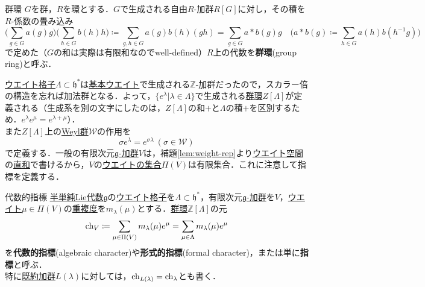 \documentclass[rep_main]{subfiles}
\begin{document}
\begin{mydef}[label=def:group-ring]{群環}
	$G$を群，$R$を環とする．$G$で生成される自由$R$-加群$R[G]$に対し，その積を$R$-係数の畳み込み
	\begin{equation}
		\biggl(\sum_{g \in G} a(g)g \biggr)\biggl(\sum_{h \in G} b(h)h \biggr) \coloneqq \sum_{g, h \in G} a(g)b(h)(gh) = \sum_{g \in G} a *b(g)g\quad  \biggl(a * b(g) \coloneqq \sum_{h \in G} a(h)b(h^{-1}g)\biggr)
	\end{equation}
	で定めた（$G$の和は実際は有限和なのでwell-defined）$R$上の代数を\textbf{群環}(group ring)と呼ぶ．
\end{mydef}
\hyperref[def:root-lattice]{ウエイト格子}$\Lambda \subset \mathfrak{h}^*$は\hyperref[def:fundamental-weight]{基本ウエイト}で生成される$\mathbb{Z}$-加群だったので，スカラー倍の構造を忘れば加法群となる．よって，$\{e^\lambda | \lambda \in \Lambda\}$で生成される\hyperref[def:group-ring]{群環}$Z[\Lambda]$が定義される（生成系を別の文字にしたのは，$Z[\Lambda]$の和$+$と$\Lambda$の積$+$を区別するため．$e^\lambda e^\mu = e^{\lambda + \mu}$）．\\
また$Z[\Lambda]$上の\hyperref[def:Weylgroup]{Weyl群}$\mathscr{W}$の作用を
\begin{equation}
	\sigma e^\lambda = e^{\sigma\lambda}\ (\sigma \in \mathscr{W})
\end{equation}
で定義する．一般の有限次元\hyperref[ax:g-module]{$\mathfrak{g}$-加群}$V$は，補題\ref{lem:weight-rep}より\hyperref[def:weight-rep]{ウエイト空間}の\hyperref[def:univ-vec-sum]{直和}で書けるから，$V$の\hyperref[def:weight-rep]{ウエイトの集合}$\Pi(V)$は有限集合．これに注意して指標を定義する．
\begin{mydef}[label=def:alg-character]{代数的指標}
	\hyperref[def:semisimple-LieAlg]{半単純Lie代数}$\mathfrak{g}$の\hyperref[def:root-lattice]{ウエイト格子}を$\Lambda \subset \mathfrak{h}^*$，有限次元\hyperref[ax:g-module]{$\mathfrak{g}$-加群}を$V$，\hyperref[def:weight-rep]{ウエイト}$\mu \in \Pi(V)$の\hyperref[def:mutiplicity]{重複度}を$m_\lambda(\mu)$とする．\hyperref[def:group-ring]{群環}$\mathbb{Z}[\Lambda]$の元
	\begin{equation}
		\operatorname{ch}_V \coloneqq \sum_{\mu \in \Pi(V)} m_\lambda(\mu)e^\mu = \sum_{\mu \in \Lambda} m_\lambda(\mu)e^\mu
	\end{equation}
	を\textbf{代数的指標}(algebraic character)や\textbf{形式的指標}(formal character)，または単に\textbf{指標}と呼ぶ．\\
	特に\hyperref[thm:hwmodule-exist]{既約加群}$L(\lambda)$に対しては，$\operatorname{ch}_{L(\lambda)} = \operatorname{ch}_\lambda$とも書く．
\end{mydef}
\end{document}
